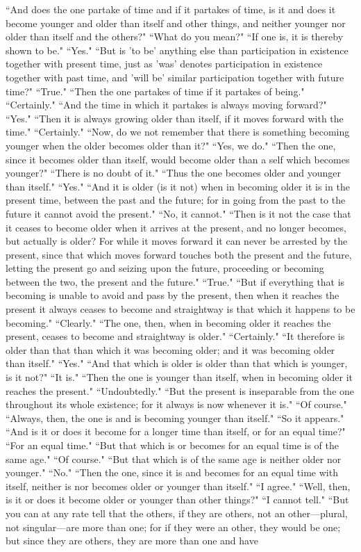 \documentclass[letterpaper,12pt]{article}
\newcommand{\stephpag}[1]{\marginnote{\small\itshape\fontfamily{ppl}\selectfont #1}}
\begin{document}
``And does the one partake of time and if it partakes of time, is it and does it become younger and older than itself and other things, and neither younger nor older than itself and the others?" ``What do you mean?" ``If one is, it is thereby shown to be." ``Yes." ``But is 'to be' anything else than participation in existence together with present time, \stephpag{152 a} just as 'was' denotes participation in existence together with past time, and 'will be' similar participation together with future time?" ``True." ``Then the one partakes of time if it partakes of being." ``Certainly." ``And the time in which it partakes is always moving forward?" ``Yes." ``Then it is always growing older than itself, if it moves forward with the time." ``Certainly." ``Now, do we not remember that there is something becoming younger when the older becomes older than it?" ``Yes, we do." ``Then the one, since it becomes older than itself, \stephpag{b} would become older than a self which becomes younger?" ``There is no doubt of it." ``Thus the one becomes older and younger than itself." ``Yes." ``And it is older (is it not) when in becoming older it is in the present time, between the past and the future; for in going from the past to the future it cannot avoid the present." ``No, it cannot." ``Then is it not the case that it ceases to become older \stephpag{c} when it arrives at the present, and no longer becomes, but actually is older? For while it moves forward it can never be arrested by the present, since that which moves forward touches both the present and the future, letting the present go and seizing upon the future, proceeding or becoming between the two, the present and the future." ``True." ``But if everything that is becoming is unable to avoid and pass by the present, then when it reaches the present it always ceases to become \stephpag{d} and straightway is that which it happens to be becoming." ``Clearly." ``The one, then, when in becoming older it reaches the present, ceases to become and straightway is older." ``Certainly." ``It therefore is older than that than which it was becoming older; and it was becoming older than itself." ``Yes." ``And that which is older is older than that which is younger, is it not?" ``It is." ``Then the one is younger than itself, when in becoming older it reaches the present." \stephpag{e} ``Undoubtedly." ``But the present is inseparable from the one throughout its whole existence; for it always is now whenever it is." ``Of course." ``Always, then, the one is and is becoming younger than itself." ``So it appears." ``And is it or does it become for a longer time than itself, or for an equal time?" ``For an equal time." ``But that which is or becomes for an equal time is of the same age." ``Of course." ``But that which is of the same age is neither older nor younger." ``No." ``Then the one, since it is and becomes for an equal time with itself, neither is nor becomes older or younger than itself." ``I agree." ``Well, then, is it or does it become older or younger than other things?" \stephpag{153 a} ``I cannot tell." ``But you can at any rate tell that the others, if they are others, not an other—plural, not singular—are more than one; for if they were an other, they would be one; but since they are others, they are more than one and have 
\end{document}
